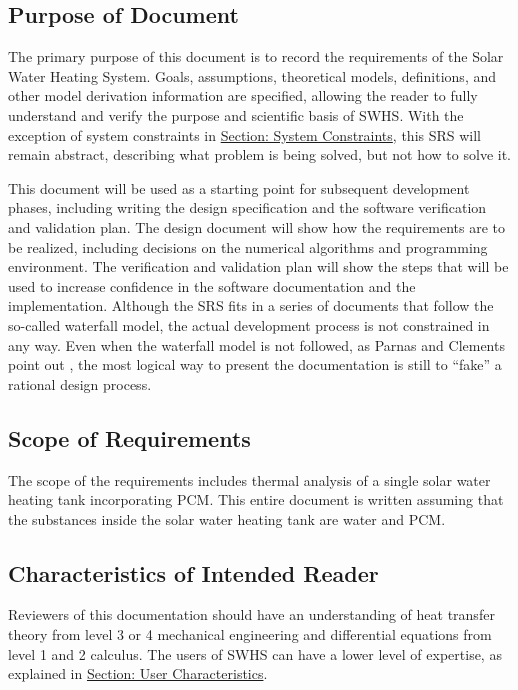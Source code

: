 \documentclass[12pt]{article}
\begin{document}
\subsection{Purpose of Document}
\label{Sec:DocPurpose}
The primary purpose of this document is to record the requirements of the Solar Water Heating System. Goals, assumptions, theoretical models, definitions, and other model derivation information are specified, allowing the reader to fully understand and verify the purpose and scientific basis of SWHS. With the exception of system constraints in \hyperref[Sec:SysConstraints]{Section: System Constraints}, this SRS will remain abstract, describing what problem is being solved, but not how to solve it.

This document will be used as a starting point for subsequent development phases, including writing the design specification and the software verification and validation plan. The design document will show how the requirements are to be realized, including decisions on the numerical algorithms and programming environment. The verification and validation plan will show the steps that will be used to increase confidence in the software documentation and the implementation. Although the SRS fits in a series of documents that follow the so-called waterfall model, the actual development process is not constrained in any way. Even when the waterfall model is not followed, as Parnas and Clements point out \cite{parnasClements1986}, the most logical way to present the documentation is still to ``fake'' a rational design process.

\subsection{Scope of Requirements}
\label{Sec:ReqsScope}
The scope of the requirements includes thermal analysis of a single solar water heating tank incorporating PCM. This entire document is written assuming that the substances inside the solar water heating tank are water and PCM.

\subsection{Characteristics of Intended Reader}
\label{Sec:ReaderChars}
Reviewers of this documentation should have an understanding of heat transfer theory from level 3 or 4 mechanical engineering and differential equations from level 1 and 2 calculus. The users of SWHS can have a lower level of expertise, as explained in \hyperref[Sec:UserChars]{Section: User Characteristics}.
\end{document}
